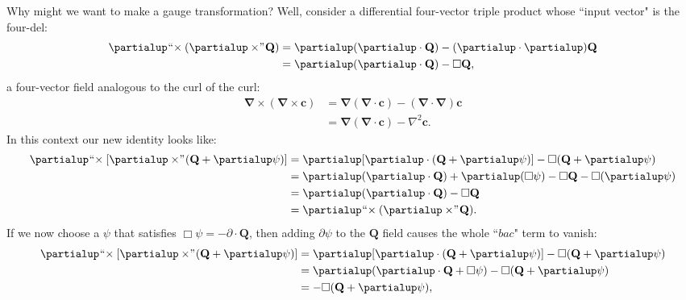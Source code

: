 \documentclass[12pt]{article}
\renewcommand{\vv}[1]{\mathbf{#1}}
\newcommand{\del}{\boldsymbol{\nabla}}
\begin{document}
Why might we want to make a gauge transformation? Well, consider a differential four-vector triple product whose ``input vector" is the four-del:
\begin{equation*}
\begin{split}
\partialup \mkern1mu `` \mkern-4mu \times ( \partialup \times \mkern-4mu " \mkern1mu \vv Q ) &= \partialup ( \partialup \cdot \vv Q) - ( \partialup \cdot \partialup) \vv Q \\
&= \partialup ( \partialup \cdot \vv Q) - \Box \vv Q ,
\end{split}
\end{equation*}
a four-vector field analogous to the curl of the curl:
\begin{equation*}
\begin{split}
\del \times ( \del \times \vv c ) &= \del (\del \cdot \vv c) - (\del \cdot \del) \vv c \\
&=  \del (\del \cdot \vv c) - \nabla ^2 \vv c .
\end{split}
\end{equation*}
In this context our new identity looks like:
\begin{equation*}
\begin{split}
\partialup \mkern1mu `` \mkern-4mu \times [ \partialup \times \mkern-4mu " \mkern1mu ( \vv Q + \partialup \psi ) ] &= \partialup [ \partialup \cdot ( \vv Q + \partialup \psi ) ] - \Box ( \vv Q + \partialup \psi ) \\
&= \partialup ( \partialup \cdot \vv Q ) + \partialup ( \Box \psi ) - \Box \vv Q - \Box ( \partialup \psi ) \\
&=  \partialup (\partialup \cdot \vv Q) - \Box \vv Q \\
&= \partialup \mkern1mu `` \mkern-4mu \times ( \partialup \times \mkern-4mu " \mkern1mu \vv Q ) .
\end{split}
\end{equation*}
If we now choose a $\psi$ that satisfies ${\Box \psi = - \partialup \cdot \vv Q}$, then adding $\partialup \psi$ to the $\vv Q$ field causes the whole ``$bac$" term to vanish:
\begin{equation*}
\begin{split}
\partialup \mkern1mu `` \mkern-4mu \times [ \partialup \times \mkern-4mu " \mkern1mu ( \vv Q + \partialup \psi ) ] &= \partialup [ \partialup \cdot ( \vv Q + \partialup \psi ) ] - \Box ( \vv Q + \partialup \psi ) \\
&= \partialup ( \partialup \cdot \vv Q + \Box \psi ) - \Box ( \vv Q + \partialup \psi ) \\
&=  - \Box ( \vv Q + \partialup \psi ) ,
\end{split}
\end{equation*}
\end{document}
